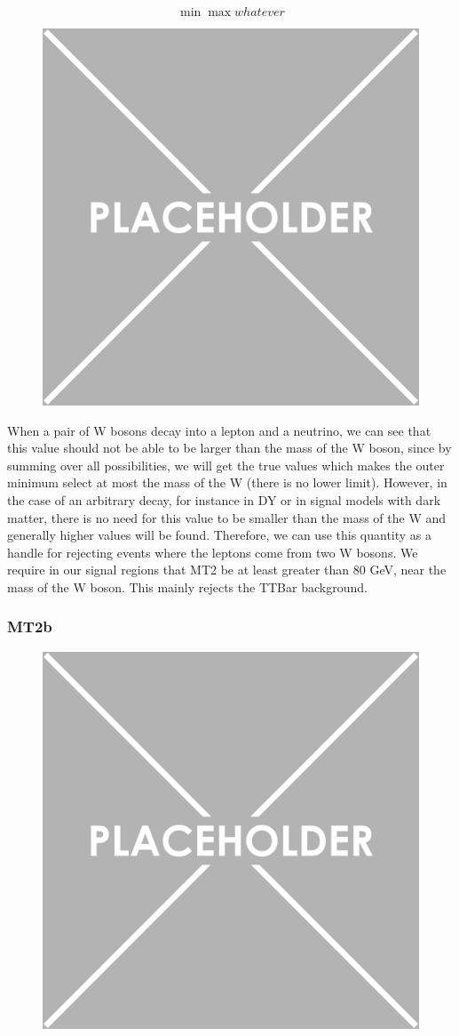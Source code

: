       \[
      \min\max{whatever}
      \]

      \begin{figure}[h!]
        \centering
        \includegraphics[width=.5\textwidth]{figures/placeholder.png}
        \caption{}
        \label{fig:MT2_feynman_diagram}
      \end{figure}

      When a pair of W bosons decay into a lepton and a neutrino, we can see that this value should not be able to be larger than the mass of the W boson, since by summing over all possibilities, we will get the true values which makes the outer minimum select at most the mass of the W (there is no lower limit). However, in the case of an arbitrary decay, for instance in DY or in signal models with dark matter, there is no need for this value to be smaller than the mass of the W and generally higher values will be found. Therefore, we can use this quantity as a handle for rejecting events where the leptons come from two W bosons. We require in our signal regions that MT2 be at least greater than 80 GeV, near the mass of the W boson. This mainly rejects the TTBar background. 

    \subsubsection{MT2b}

      \begin{figure}[h!]
        \centering
        \includegraphics[width=.5\textwidth]{figures/placeholder.png}
        \caption{}
        \label{fig:ttbar_feynman_diagram}
      \end{figure}

